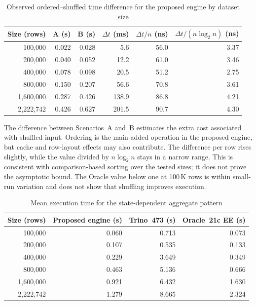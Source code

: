 \begin{table}[H]
\centering
\caption{Observed ordered--shuffled time difference for the proposed
  engine by dataset size}
\label{tab:sort_cost_by_size}
\begin{tabular}{rrrrrr}
\toprule
\textbf{Size (rows)} & \textbf{A (s)} & \textbf{B (s)}
  & \textbf{$\Delta t$ (ms)} & \textbf{$\Delta t/n$ (ns)}
  & \textbf{$\Delta t/(n\log_2 n)$ (ns)} \\
\midrule
100{,}000 & 0.022 & 0.028 & 5.6 & 56.0 & 3.37 \\
200{,}000 & 0.040 & 0.052 & 12.2 & 61.0 & 3.46 \\
400{,}000 & 0.078 & 0.098 & 20.5 & 51.2 & 2.75 \\
800{,}000 & 0.150 & 0.207 & 56.6 & 70.8 & 3.61 \\
1{,}600{,}000 & 0.287 & 0.426 & 138.9 & 86.8 & 4.21 \\
2{,}222{,}742 & 0.426 & 0.627 & 201.5 & 90.7 & 4.30 \\
\bottomrule
\end{tabular}
\end{table}

The difference between Scenarios~A and~B estimates the extra cost
associated with shuffled input.  Ordering is the main added operation
in the proposed engine, but cache and row-layout effects may also
contribute.  The difference per row rises slightly, while the value
divided by $n\log_2 n$ stays in a narrow range.  This is consistent
with comparison-based sorting over the tested sizes; it does not prove
the asymptotic bound.  The Oracle value below one at 100\,K rows is
within small-run variation and does not show that shuffling improves
execution.

\begin{table}[htbp]
\centering
\caption{Mean execution time for the state-dependent aggregate pattern}
\label{tab:worstcase_coverage}
\begin{tabular}{rrrr}
\toprule
\textbf{Size (rows)} & \textbf{Proposed engine (s)}
  & \textbf{Trino~473 (s)} & \textbf{Oracle~21c EE (s)} \\
\midrule
100{,}000 & 0.060 & 0.713 & 0.073 \\
200{,}000 & 0.107 & 0.535 & 0.133 \\
400{,}000 & 0.229 & 3.649 & 0.349 \\
800{,}000 & 0.463 & 5.136 & 0.666 \\
1{,}600{,}000 & 0.921 & 6.432 & 1.630 \\
2{,}222{,}742 & 1.279 & 8.665 & 2.324 \\
\bottomrule
\end{tabular}
\end{table}

